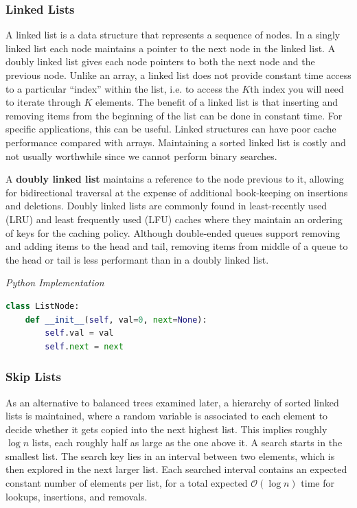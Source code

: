 \documentclass{article}
\newcommand{\bigO}{\mathcal{O}}
\begin{document}
    
    \subsubsection{Linked Lists}
    A linked list is a data structure that represents a sequence of nodes. In a singly linked list each node maintains a pointer to the next node in the linked list. A doubly linked list gives each node pointers to both the next node and the previous node. Unlike an array, a linked list does not provide constant time access to a particular ``index'' within the list, i.e. to access the $K$th index you will need to iterate through $K$ elements. The benefit of a linked list is that inserting and removing items from the beginning of the list can be done in constant time. For specific applications, this can be useful. Linked structures can have poor cache performance compared with arrays. Maintaining a sorted linked list is costly and not usually worthwhile since we cannot perform binary searches.

    A \textbf{doubly linked list} maintains a reference to the node previous to it, allowing for bidirectional traversal at the expense of additional book-keeping on insertions and deletions. Doubly linked lists are commonly found in least-recently used (LRU) and least frequently used (LFU) caches where they maintain an ordering of keys for the caching policy. Although double-ended queues support removing and adding items to the head and tail, removing items from middle of a queue to the head or tail is less performant than in a doubly linked list.
    
\vspace{8pt} \emph{Python Implementation}
\begin{lstlisting}[language=Python]
class ListNode:
    def __init__(self, val=0, next=None):
        self.val = val
        self.next = next
\end{lstlisting}
        
    \subsubsection{Skip Lists}
    As an alternative to balanced trees examined later, a hierarchy of sorted linked lists is maintained, where a random variable is associated to each element to decide whether it gets copied into the next highest list. This implies roughly $\log n$ lists, each roughly half as large as the one above it. A search starts in the smallest list. The search key lies in an interval between two elements, which is then explored in the next larger list. Each searched interval contains an expected constant number of elements per list, for a total expected $\bigO(\log n)$ time for lookups, insertions, and removals. 
    
\end{document}
